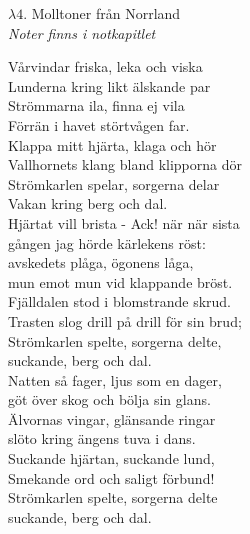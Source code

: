 \documentclass[a6paper,10pt]{article}
\begin{document}
\setlength{\oddsidemargin}{-0.37in}
\noindent
\begin{center}
\Large $\lambda4$. Molltoner från Norrland\\
\small \textit{Noter finns i notkapitlet}
\end{center}
Vårvindar friska, leka och viska\\
Lunderna kring likt älskande par\\
Strömmarna ila, finna ej vila\\
Förrän i havet störtvågen far.\\
Klappa mitt hjärta, klaga och hör\\
Vallhornets klang bland klipporna dör\\
Strömkarlen spelar, sorgerna delar\\
Vakan kring berg och dal.
\vspace{5pt}\\
Hjärtat vill brista - Ack! när när sista\\
gången jag hörde kärlekens röst:\\
avskedets plåga, ögonens låga,\\
mun emot mun vid klappande bröst.\\
Fjälldalen stod i blomstrande skrud.\\
Trasten slog drill på drill för sin brud;\\
Strömkarlen spelte, sorgerna delte,\\
suckande, berg och dal.
\vspace{5pt}\\
Natten så fager, ljus som en dager,\\
göt över skog och bölja sin glans.\\
Älvornas vingar, glänsande ringar\\
slöto kring ängens tuva i dans.\\
Suckande hjärtan, suckande lund,\\
Smekande ord och saligt förbund!\\
Strömkarlen spelte, sorgerna delte\\
suckande, berg och dal.
\end{document}
